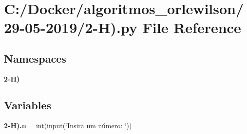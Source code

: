 \section{C\+:/\+Docker/algoritmos\+\_\+orlewilson/29-\/05-\/2019/2-\/H).py File Reference}
\label{2-_h_08_8py}
\subsection*{Namespaces}
\begin{DoxyCompactItemize}
\item 
 \textbf{ 2-\/\+H)}
\end{DoxyCompactItemize}
\subsection*{Variables}
\begin{DoxyCompactItemize}
\item 
\textbf{ 2-\/\+H).\+n} = int(input(\char`\"{}Insira um número\+: \char`\"{}))
\end{DoxyCompactItemize}
